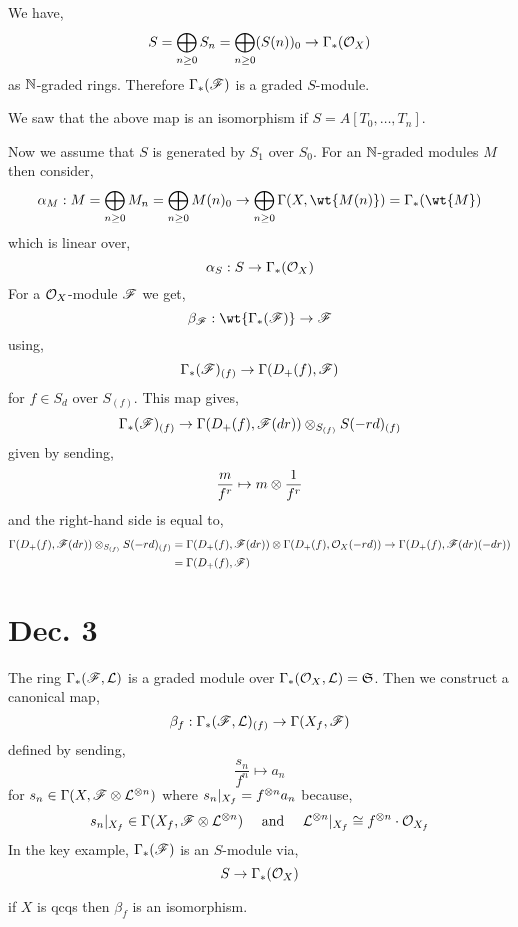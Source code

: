\documentclass[12pt]{article}
\begin{document}
\begin{rmk}
We have,
\[ S = \bigoplus_{n \ge 0} S_n = \bigoplus_{n \ge 0} (S(n))_0 \to \Gamma_*(\mathcal{O}_{X}) \]
as $\mathbb{N}$-graded rings. Therefore $\Gamma_*(\mathscr{F})$ is a graded $S$-module.
\end{rmk}

\begin{rmk}
We saw that the above map is an isomorphism if $S = A[T_0, \dots, T_n]$.
\end{rmk}

Now we assume that $S$ is generated by $S_1$ over $S_0$. 
For an $\mathbb{N}$-graded modules $M$ then consider,
\[ \alpha_M : M = \bigoplus_{n \ge 0} M_n = \bigoplus_{n \ge 0} M(n)_0 \to \bigoplus_{n \ge 0} \Gamma(X, \wt{M(n)}) = \Gamma_*(\wt{M}) \]
which is linear over,
\[ \alpha_S : S \to \Gamma_*(\mathcal{O}_{X}) \]
For a $\mathcal{O}_{X}$-module $\mathscr{F}$ we get,
\[ \beta_\F : \wt{\Gamma_*(\F)} \to \F \]
using,
\[ \Gamma_*(\mathscr{F})_{(f)} \to \Gamma(D_+(f), \mathscr{F}) \]
for $f \in S_d$ over $S_{(f)}$. This map gives,
\[ \Gamma_*(\mathscr{F})_{(f)} \to \Gamma(D_+(f), \mathscr{F}(dr)) \otimes_{S_{(f)}} S(-rd)_{(f)} \]
given by sending,
\[ \frac{m}{f^r} \mapsto m \otimes \frac{1}{f^r} \]
and the right-hand side is equal to,
\begin{align*}
 \Gamma(D_+(f), \mathscr{F}(dr)) \otimes_{S_{(f)}} S(-rd)_{(f)} & = \Gamma(D_+(f), \mathscr{F}(dr)) \otimes \Gamma(D_+(f), \mathcal{O}_{X}(-rd)) \to \Gamma(D_+(f), \mathscr{F}(dr)(-dr))
\\
& = \Gamma(D_+(f), \mathscr{F})
\end{align*}

\section{Dec. 3}

The ring $\Gamma_*(\mathscr{F}, \mathcal{L})$ is a graded module over $\Gamma_*(\mathcal{O}_{X}, \mathcal{L}) = \mathfrak{S}$. Then we construct a canonical map,
\[ \beta_f : \Gamma_*(\mathscr{F}, \mathcal{L})_{(f)} \to \Gamma(X_f, \mathscr{F}) \]
defined by sending,
\[ \frac{s_n}{f^n} \mapsto a_n \]
for $s_n \in \Gamma(X, \mathscr{F} \otimes \mathcal{L}^{\otimes n})$ where $s_n|_{X_f} = f^{\otimes n} a_n$ because,
\[ s_n|_{X_f} \in \Gamma(X_f, \mathscr{F} \otimes \mathcal{L}^{\otimes n}) \quad \text{ and } \quad \mathcal{L}^{\otimes n} |_{X_f} \cong f^{\otimes n} \cdot \mathcal{O}_{X_f} \]
In the key example, $\Gamma_*(\mathscr{F})$ is an $S$-module via,
\[ S \to \Gamma_*(\mathcal{O}_{X}) \]

\begin{lemma}
if $X$ is qcqs then $\beta_f$ is an isomorphism.
\end{lemma}
\end{document}
